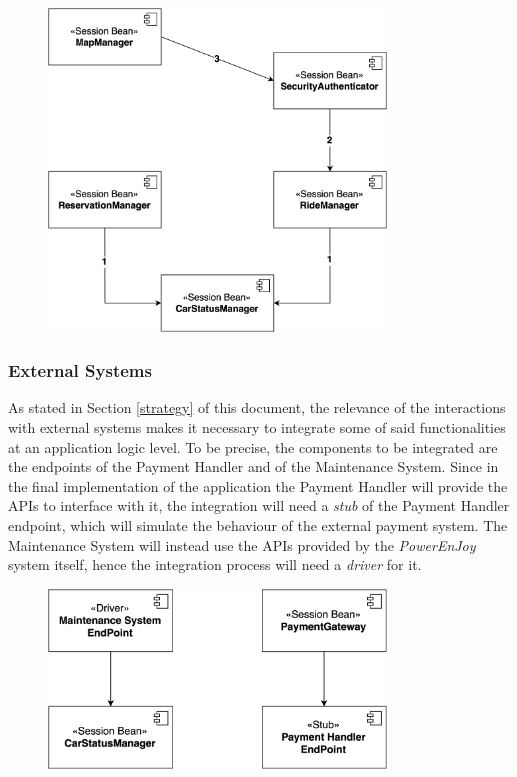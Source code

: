 \begin{figure}[H]
\begin{center}
		\includegraphics[width=0.8\textwidth]{./integration_strategy/diagrams/ride_reservation.png}
\end{center}
\end{figure}

\subsubsection{External Systems}
As stated in Section \ref{strategy} of this document, the relevance of the interactions with external systems makes it necessary to integrate some of said functionalities at an application logic level.
\noindent
To be precise, the components to be integrated are the endpoints of the Payment Handler and of the Maintenance System. Since in the final implementation of the application the Payment Handler will provide the APIs to interface with it, the integration will need a \emph{stub} of the Payment Handler endpoint, which will simulate the behaviour of the external payment system. The Maintenance System will instead use the APIs provided by the \textit{PowerEnJoy} system itself, hence the integration process will need a \emph{driver} for it.

\begin{figure}[H]
\begin{center}
		\includegraphics[width=0.8\textwidth]{./integration_strategy/diagrams/external_systems.png}
\end{center}
\end{figure}


